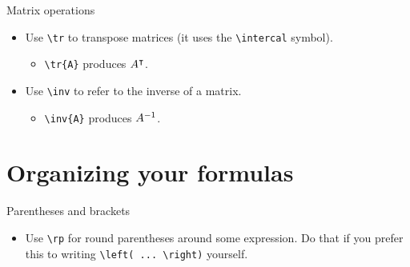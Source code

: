 \documentclass{beamer}
\begin{document}
    \begin{frame}[fragile]{Matrix operations}
        \begin{itemize}
            \item Use \verb!\tr! to \alert{transpose} matrices (it uses the \verb!\intercal! symbol).
                \begin{itemize}
                    \item \verb!\tr{A}! produces ${A}^{\intercal}$.
                \end{itemize}
            \item Use \verb!\inv! to refer to the \alert{inverse} of a matrix.
            \begin{itemize}
                \item \verb!\inv{A}! produces ${A}^{-1}$.
            \end{itemize}
        \end{itemize}
    \end{frame}

\section{Organizing your formulas}
\label{sec:org}

    \begin{frame}[fragile]{Parentheses and brackets}
        \begin{itemize}
            \item Use \verb!\rp! for \alert{round parentheses} around some expression.
            Do that if you prefer this to writing \verb!\left( ... \right)! yourself.
        \end{itemize}
    \end{frame}
\end{document}
